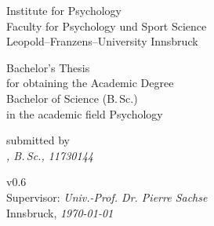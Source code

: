 \begin{titlepage}
   \begin{center}
        Institute for Psychology\\
        Faculty for Psychology und Sport Science\\
        Leopold--Franzens--University Innsbruck
 
        \vspace{4cm}
        \textit{\textbf{\Large {\@title}}}
 
        \vspace{2cm}
        Bachelor's Thesis\\
        for obtaining the Academic Degree\\
        Bachelor of Science (B.\,Sc.)\\
        in the academic field Psychology
 
        \vspace{3cm}
        submitted by\\
        \textit{\@author, B.\,Sc., 11730144}
 
        \vfill
 
        v0.6\\
        Supervisor: \textit{Univ.-Prof. Dr. Pierre Sachse}\\
        Innsbruck, \textit{\today}
   \end{center}
\end{titlepage}